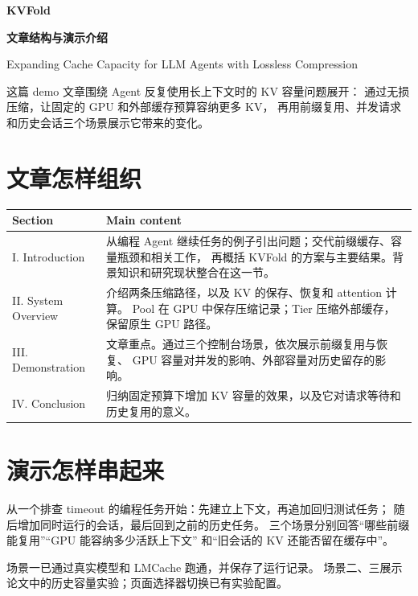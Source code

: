 \documentclass[UTF8,fontset=none,a4paper,11pt]{ctexart}
\begin{document}
{\fontsize{25}{32}\selectfont\bfseries\color{fpBlue}KVFold\par}
{\Large\bfseries 文章结构与演示介绍\par}
\vspace{2mm}
{\small Expanding Cache Capacity for LLM Agents with Lossless Compression\par}

这篇 demo 文章围绕 Agent 反复使用长上下文时的 KV 容量问题展开：
通过无损压缩，让固定的 GPU 和外部缓存预算容纳更多 KV，
再用前缀复用、并发请求和历史会话三个场景展示它带来的变化。

\section*{文章怎样组织}

\begin{small}
\begin{tabularx}{\linewidth}{@{}L{4.25cm}Y@{}}
\toprule
Section & Main content \\
\midrule
I. Introduction &
从编程 Agent 继续任务的例子引出问题；交代前缀缓存、容量瓶颈和相关工作，
再概括 KVFold 的方案与主要结果。背景知识和研究现状整合在这一节。 \\
II. System Overview &
介绍两条压缩路径，以及 KV 的保存、恢复和 attention 计算。
Pool 在 GPU 中保存压缩记录；Tier 压缩外部缓存，保留原生 GPU 路径。 \\
III. Demonstration &
文章重点。通过三个控制台场景，依次展示前缀复用与恢复、
GPU 容量对并发的影响、外部容量对历史留存的影响。 \\
IV. Conclusion &
归纳固定预算下增加 KV 容量的效果，以及它对请求等待和历史复用的意义。 \\
\bottomrule
\end{tabularx}\par
\end{small}

\section*{演示怎样串起来}

从一个排查 timeout 的编程任务开始：先建立上下文，再追加回归测试任务；
随后增加同时运行的会话，最后回到之前的历史任务。
三个场景分别回答“哪些前缀能复用”“GPU 能容纳多少活跃上下文”
和“旧会话的 KV 还能否留在缓存中”。

\begin{messagebox}
场景一已通过真实模型和 LMCache 跑通，并保存了运行记录。
场景二、三展示论文中的历史容量实验；页面选择器切换已有实验配置。
\end{messagebox}
\end{document}
